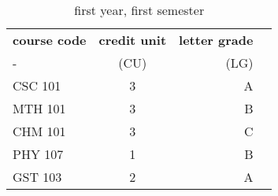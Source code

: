 \documentclass{article}
\begin{document}
	
	\begin{table}[h!]
		\begin{center}
			\caption{first year, first semester}
			\label{tab:table1}
			\begin{tabular}{l|c|r|c}
				\textbf{course code} & \textbf{credit unit} &
				\textbf{letter grade}\\- & (CU) & (LG) \\
				\hline
				CSC 101 & 3 & A\\
				MTH 101 & 3 & B\\
				CHM 101 & 3 & C\\
				PHY 107 & 1 & B\\
				GST 103 & 2 & A\\
			\end{tabular}
		\end{center}
	\end{table}
\end{document}
